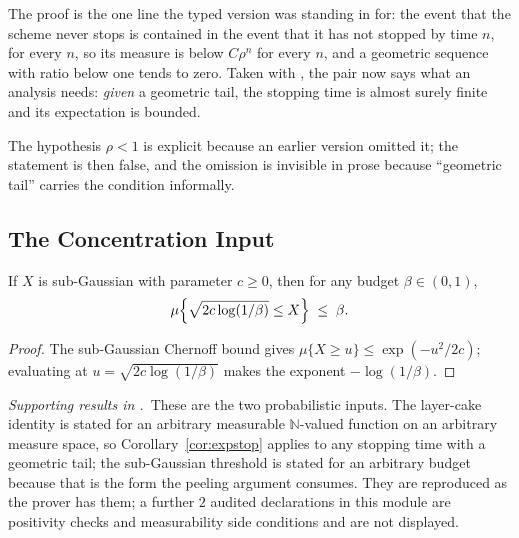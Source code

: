 
The proof is the one line the typed version was standing in for: the event that the scheme
never stops is contained in the event that it has not stopped by time $n$, for every $n$, so
its measure is below $C\rho^{n}$ for every $n$, and a geometric sequence with ratio below one
tends to zero. Taken with , the pair now says what an analysis
needs: \emph{given} a geometric tail, the stopping time is almost surely finite and its
expectation is bounded.

The hypothesis $\rho<1$ is explicit because an earlier version omitted it; the statement is
then false, and the omission is invisible in prose because ``geometric tail'' carries the
condition informally.

\subsection{The Concentration Input}
\label{sec:subgauss}

\begin{theorem}
\label{thm:subgauss}
If $X$ is sub-Gaussian with parameter $c\ge0$, then for any budget $\beta\in(0,1)$,
\begin{equation}
\mu\Bigl\{\sqrt{2c\log(1/\beta)}\leq X\Bigr\}\;\leq\;\beta .
\label{eq:subgauss}
\end{equation}
\end{theorem}

\begin{proof}
The sub-Gaussian Chernoff bound gives $\mu\{X\ge u\}\le\exp(-u^{2}/2c)$; evaluating at
$u=\sqrt{2c\log(1/\beta)}$ makes the exponent $-\log(1/\beta)$.
\end{proof}


\noindent\emph{Supporting results in .}~These are the two probabilistic inputs. The layer-cake identity is stated for an arbitrary measurable $\mathbb{N}$-valued function on an arbitrary measure space, so Corollary~\ref{cor:expstop} applies to any stopping time with a geometric tail; the sub-Gaussian threshold is stated for an arbitrary budget because that is the form the peeling argument consumes. They are reproduced as the prover has them; a further $2$ audited declarations in this module are positivity checks and measurability side conditions and are not displayed.

